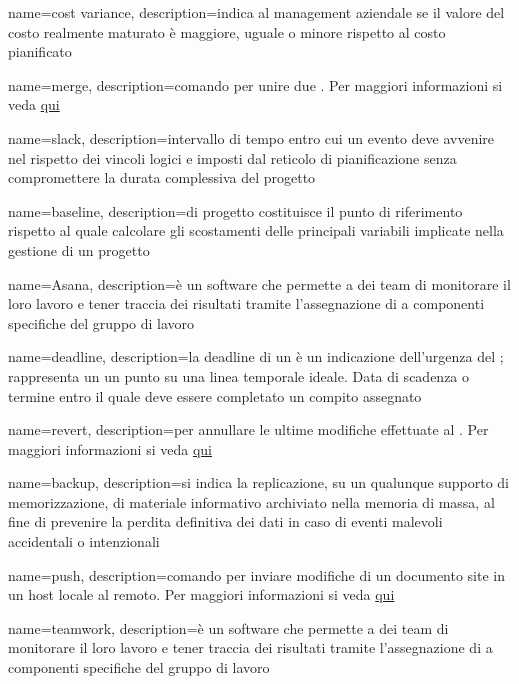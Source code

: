  {
	name=cost variance,
	description={indica al management aziendale se il valore del costo realmente maturato è maggiore, uguale o minore rispetto al costo pianificato}
}


 {
	name=merge,
	description={comando  per unire due . Per maggiori informazioni si veda \href{https://git-scm.com/docs/}{qui}}
}

 {
	name=slack,
	description={intervallo di tempo entro cui un evento deve avvenire nel rispetto dei vincoli logici e imposti dal reticolo di pianificazione senza compromettere la durata complessiva del progetto}
}

 {
	name=baseline,
	description={di progetto costituisce il punto di riferimento rispetto al quale calcolare gli scostamenti delle principali variabili implicate nella gestione di un progetto}
}

 {
	name=Asana,
	description={è un software che permette a dei team di monitorare il loro lavoro e tener traccia dei risultati tramite l'assegnazione di  a componenti specifiche del gruppo di lavoro}
}

 {
	name=deadline,
	description={la deadline di un  è un indicazione dell'urgenza del ; rappresenta un un punto su una linea temporale ideale. Data di scadenza o termine entro il quale deve essere completato un compito assegnato}
}

 {
	name=revert,
	description={per annullare le ultime modifiche effettuate al . Per maggiori informazioni si veda \href{https://git-scm.com/docs/}{qui}}
}

 {
	name=backup,
	description={si indica la replicazione, su un qualunque supporto di memorizzazione, di materiale informativo archiviato nella memoria di massa, al fine di prevenire la perdita definitiva dei dati in caso di eventi malevoli accidentali o intenzionali}
}

 {
	name=push,
	description={comando  per inviare modifiche di un documento site in un host locale al  remoto. Per maggiori informazioni si veda \href{https://git-scm.com/docs/}{qui}}
}

 {
	name=teamwork,
	description={è un software che permette a dei team di monitorare il loro lavoro e tener traccia dei risultati tramite l'assegnazione di  a componenti specifiche del gruppo di lavoro}
}

